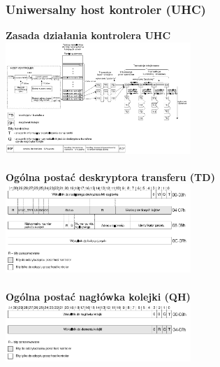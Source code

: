 \documentclass[a4paper,twoside]{article}
\begin{document}
	\subsubsection{Uniwersalny host kontroler (UHC)}
	\textbf{Zasada działania kontrolera UHC}\\
	\includegraphics[width=7cm]{./wyklady/USB_46_1.pdf}\\\\
	\textbf{Ogólna postać deskryptora transferu (TD)}\\
	\includegraphics[width=7cm]{./wyklady/USB_47_1.pdf}\\\\
	\textbf{Ogólna postać nagłówka kolejki (QH)}\\
	\includegraphics[width=7cm]{./wyklady/USB_48_1.pdf}
\end{document}
